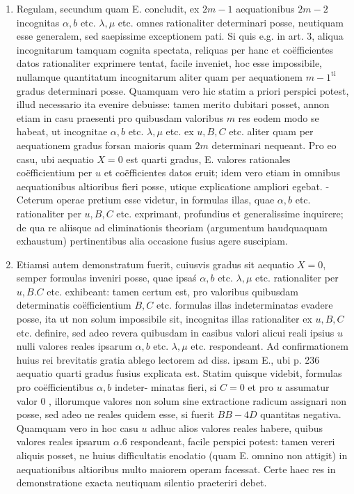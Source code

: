 \documentclass[twoside,12pt, showframe]{memoir}
\begin{document}
\begin{enumerate}
  \item Regulam, secundum quam E. concludit, ex \(2 m-1\) aequationibus \(2 m-2\) incognitas \(\alpha, b\) etc. \(\lambda, \mu\) etc. omnes rationaliter determinari posse, neutiquam esse generalem, sed saepissime exceptionem pati. Si quis e.g. in art. 3, aliqua incognitarum tamquam cognita spectata, reliquas per hanc et coëfficientes datos rationaliter exprimere tentat, facile inveniet, hoc esse impossibile, nullamque quantitatum incognitarum aliter quam per aequationem \(m-1^{\text {ti }}\) gradus determinari posse. Quamquam vero hic statim a priori perspici potest, illud necessario ita evenire debuisse: tamen merito dubitari posset, annon etiam in casu praesenti pro quibusdam valoribus \(m\) res eodem modo se habeat, ut incognitae \(\alpha, b\) etc. \(\lambda, \mu\) etc. ex \(u, B, C\) etc. aliter quam per aequationem gradus forsan maioris quam \(2 m\) determinari nequeant. Pro eo casu, ubi aequatio \(X=0\) est quarti gradus, E. valores rationales coëfficientium per \(u\) et coëfficientes datos eruit; idem vero etiam in omnibus aequationibus altioribus fieri posse, utique explicatione ampliori egebat. - Ceterum operae pretium esse videtur, in formulas illas, quae \(\alpha, b\) etc. rationaliter per \(u, B, C\) etc. exprimant, profundius et generalissime inquirere; de qua re aliisque ad eliminationis theoriam (argumentum haudquaquam exhaustum) pertinentibus alia occasione fusius agere suscipiam.

  \item Etiamsi autem demonstratum fuerit, cuiusvis gradus sit aequatio \(X=0\), semper formulas inveniri posse, quae ipsaś \(\alpha, b\) etc. \(\lambda, \mu\) etc. rationaliter per \(u, B . C\) etc. exhibeant: tamen certum est, pro valoribus quibusdam determinatis coëfficientium \(B, C\) etc. formulas illas indeterminatas evadere posse, ita ut non solum impossibile sit, incognitas illas rationaliter ex \(u, B, C\) etc. definire, sed adeo revera quibusdam in casibus valori alicui reali ipsius \(u\) nulli valores reales ipsarum \(\alpha, b\) etc. \(\lambda, \mu\) etc. respondeant. Ad confirmationem huius rei brevitatis gratia ablego lectorem ad diss. ipsam E., ubi p. 236 aequatio quarti gradus fusius explicata est. Statim quisque videbit, formulas pro coëfficientibus \(\alpha, b\) indeter-
minatas fieri, si \(C=0\) et pro \(u\) assumatur valor 0 , illorumque valores non solum sine extractione radicum assignari non posse, sed adeo ne reales quidem esse, si fuerit \(B B-4 D\) quantitas negativa. Quamquam vero in hoc casu \(u\) adhuc alios valores reales habere, quibus valores reales ipsarum \(\alpha .6\) respondeant, facile perspici potest: tamen vereri aliquis posset, ne huius difficultatis enodatio (quam E. omnino non attigit) in aequationibus altioribus multo maiorem operam facessat. Certe haec res in demonstratione exacta neutiquam silentio praeteriri debet.


\end{enumerate}
\end{document}
